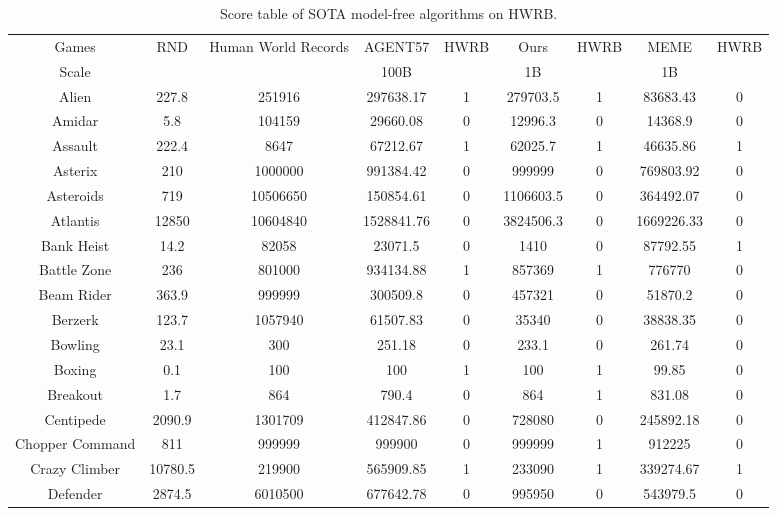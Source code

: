 \begin{table}[!hb]
\footnotesize
\begin{center}
\caption{Score table of  SOTA  model-free algorithms on HWRB.}
\label{Tab:Score table of SOTA  model-free algorithms on HWRB.}
\setlength{\tabcolsep}{1.0pt}
\begin{tabular}{c cc cc cc cc}
\toprule
Games & RND & Human World Records & AGENT57 & HWRB & Ours & HWRB & MEME & HWRB \\ 
        Scale & ~ & ~ & 100B & ~ & 1B & ~ & 1B & ~ \\ \midrule
        Alien & 227.8 & 251916 & 297638.17 & 1  & 279703.5 & 1  & 83683.43	&0\\  
        Amidar & 5.8 & 104159 & 29660.08 & 0  & 12996.3 & 0  & 14368.9	& 0\\  
        Assault & 222.4 & 8647 & 67212.67 & 1  & 62025.7 & 1 & 46635.86	&1 \\  
        Asterix & 210 & 1000000 & 991384.42 & 0  & 999999 & 0  & 769803.92	& 0\\  
        Asteroids & 719 & 10506650 & 150854.61 & 0  & 1106603.5 & 0  & 364492.07	&0\\  
        Atlantis & 12850 & 10604840 & 1528841.76 & 0  & 3824506.3 & 0  &1669226.33	&0\\  
        Bank Heist & 14.2 & 82058 & 23071.5 & 0  & 1410 & 0  & 87792.55	&1\\  
        Battle Zone & 236 & 801000 & 934134.88 & 1  & 857369 & 1  & 776770	&0\\  
        Beam Rider & 363.9 & 999999 & 300509.8 & 0  & 457321 & 0  & 51870.2	&0\\  
        Berzerk & 123.7 & 1057940 & 61507.83 & 0  & 35340 & 0  & 38838.35	&0\\  
        Bowling & 23.1 & 300 & 251.18 & 0  & 233.1 & 0  &261.74	& 0\\  
        Boxing & 0.1 & 100 & 100 & 1  & 100 & 1  & 99.85	&0\\  
        Breakout & 1.7 & 864 & 790.4 & 0  & 864 & 1  & 831.08	& 0\\  
        Centipede & 2090.9 & 1301709 & 412847.86 & 0  & 728080 & 0  & 245892.18	& 0\\  
        Chopper Command & 811 & 999999 & 999900 & 0  & 999999 & 1  & 912225	&0\\  
        Crazy Climber & 10780.5 & 219900 & 565909.85 & 1  & 233090 & 1  & 339274.67	&1\\  
        Defender & 2874.5 & 6010500 & 677642.78 & 0  & 995950 & 0  &543979.5	&0\\  

\end{tabular}
\end{center}
\end{table}
